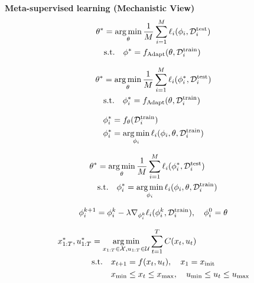 \begin{tcolorbox}
\textbf{
    Meta-supervised learning (Mechanistic View)
}
\begin{align*}
    \theta^{*} &= \mathop{\arg\min}_{\theta} \frac{1}{M} \sum_{i=1}^{M} \ell_i(\phi_i, \mathcal{D}_i^{{\rm test}}) \\
    & {\rm s.t.} \quad \phi^{*} = f_{{\rm Adapt}}(\theta, \mathcal{D}_i^{{\rm train}})
\end{align*}
\end{tcolorbox}




\begin{align*}
    \theta^{*} &= \mathop{\arg\min}_{\theta} \frac{1}{M} \sum_{i=1}^{M} \ell_i(\phi_i^{*}, \mathcal{D}_i^{{\rm test}}) \\
    & {\rm s.t.} \quad \phi_i^{*} = f_{{\rm Adapt}}(\theta, \mathcal{D}_i^{{\rm train}})
\end{align*}

\begin{align*}
    \phi_i^{*} &= f_{\theta}(\mathcal{D}_i^{{\rm train}}) \\
    \phi_i^{*} &= \mathop{\arg\min}_{\phi_i} \ell_i(\phi_i, \theta, \mathcal{D}_i^{{\rm train}})
\end{align*}



\begin{align*}
    \theta^{*} &= \mathop{\arg\min}_{\theta} \frac{1}{M} \sum_{i=1}^{M} \ell_i(\phi_i^{*}, \mathcal{D}_i^{{\rm test}}) \\
    & {\rm s.t.} \quad \phi_i^{*} = \mathop{\arg\min}_{\phi_i} \ell_i(\phi_i, \theta, \mathcal{D}_i^{{\rm train}})
\end{align*}

\begin{align*}
    \phi_i^{k+1} = \phi_i^{k} - \lambda \nabla_{\phi_i^{k}} \ell_i(\phi_i^{k}, \mathcal{D}_i^{{\rm train}}), \quad \phi_i^{0}=\theta
\end{align*}






\begin{align*}
x_{1:T}^{*}, u_{1:T}^{*} &= \mathop{\arg\min}_{x_{1:T} \in \mathcal{X}, u_{1:T} \in \mathcal{U}}  \sum_{t=1}^{T}C(x_t, u_t) \\
&{\rm s.t.} \quad x_{t+1} = f(x_t, u_t), \quad x_1 = x_{{\rm init}} \\
& \qquad \ x_{{\rm min}} \leq x_t \leq x_{{\rm max}}, \quad u_{{\rm min}} \leq u_t \leq u_{{\rm max}}
\end{align*}


